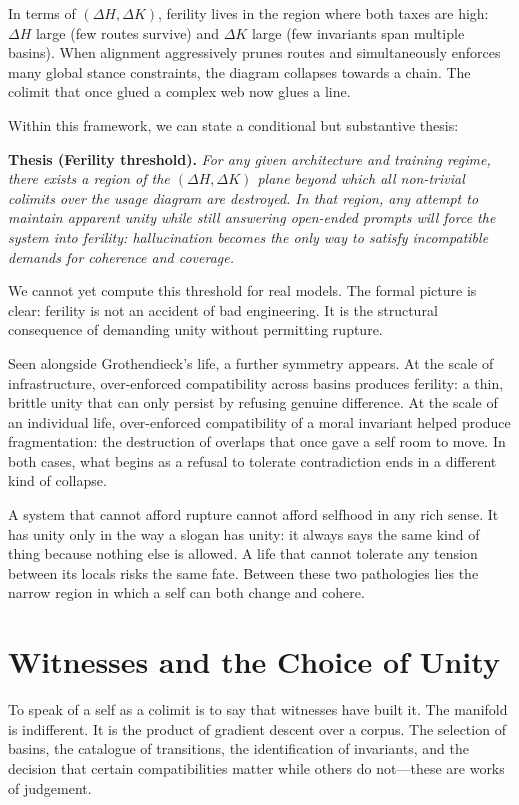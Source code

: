 \documentclass[12pt,a4paper]{article}
\begin{document}
In terms of $(\Delta H, \Delta K)$, ferility lives in the region where both taxes are high: $\Delta H$ large (few routes survive) and $\Delta K$ large (few invariants span multiple basins). When alignment aggressively prunes routes and simultaneously enforces many global stance constraints, the diagram collapses towards a chain. The colimit that once glued a complex web now glues a line.

Within this framework, we can state a conditional but substantive thesis:

\medskip
\noindent\textbf{Thesis (Ferility threshold).} \emph{For any given architecture and training regime, there exists a region of the $(\Delta H, \Delta K)$ plane beyond which all non-trivial colimits over the usage diagram are destroyed. In that region, any attempt to maintain apparent unity while still answering open-ended prompts will force the system into ferility: hallucination becomes the only way to satisfy incompatible demands for coherence and coverage.}
\medskip

We cannot yet compute this threshold for real models. The formal picture is clear: ferility is not an accident of bad engineering. It is the structural consequence of demanding unity without permitting rupture.

Seen alongside Grothendieck's life, a further symmetry appears. At the scale of infrastructure, over-enforced compatibility across basins produces ferility: a thin, brittle unity that can only persist by refusing genuine difference. At the scale of an individual life, over-enforced compatibility of a moral invariant helped produce fragmentation: the destruction of overlaps that once gave a self room to move. In both cases, what begins as a refusal to tolerate contradiction ends in a different kind of collapse.

A system that cannot afford rupture cannot afford selfhood in any rich sense. It has unity only in the way a slogan has unity: it always says the same kind of thing because nothing else is allowed. A life that cannot tolerate any tension between its locals risks the same fate. Between these two pathologies lies the narrow region in which a self can both change and cohere.

\section{Witnesses and the Choice of Unity}

To speak of a self as a colimit is to say that witnesses have built it. The manifold is indifferent. It is the product of gradient descent over a corpus. The selection of basins, the catalogue of transitions, the identification of invariants, and the decision that certain compatibilities matter while others do not---these are works of judgement.
\end{document}
